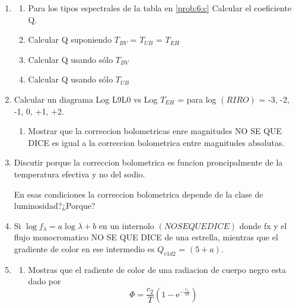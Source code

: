 \documentclass[10pt,spanish,a4paper,1p]{practice}
\begin{document}
\begin{enumerate}[wide, labelwidth=!, labelindent=0pt, label=\textbf{\textrm{\arabic*)}}, ref=\arabic*]
    \item\label{prob:8}\hfill
        \begin{enumerate}
            \item \label{prob:8:a} Para los tipos espectrales de la tabla en \ref{prob:6:c} Calcular el coeficiente Q.

            \item \label{prob:8:b} Calcular Q suponiendo $T_{BV}$ = $T_{UB}$ = $T_{EH}$

            \item \label{prob:8:c} Calcular Q usando sólo $T_{BV}$

            \item \label{prob:8:d} Calcular Q usando sólo $T_{UB}$
        \end{enumerate}

    \item\label{prob:9}Calcular un diagrama Log L9L0 vs Log $T_{EH}$ = para log $\left(RIRO\right)$ = -3, -2, -1, 0, +1, +2.

        \begin{enumerate}
            \item\label{prob:9:a} Mostrar que la correccion bolometricas enre magnitudes NO SE QUE DICE  es igual a la correccion bolometrica entre magnitudes absolutas.
       \end{enumerate}

    \item\label{prob:10} Discutir porque la correccion bolometrica es funcion proncipalmente de la temperatura efectiva y no del sodio.

        En esas condiciones la correccion bolometrica depende de la clase de luminosidad?¿Porque?

    \item\label{prob:11} Si $\log f_{\lambda} = a\log\lambda + b$ en un internolo $\left(NO SE QUE DICE\right)$ donde fx y el flujo monocromatico NO SE QUE DICE de una estrella, mientras que el gradiente de color en ese intermedio es $Q_{v1d2}$ = $\left(5+a\right)$.

    \item\label{prob:12}\hfill
        \begin{enumerate}
            \item\label{prob:12:a} Mostras que el radiente de color de una radiacion de cuerpo negro esta dado por
                $$
                    \Phi = \frac{c_2}{T}\left(1 - \mathrm{e}^{-\frac{c_2}{\lambda T}}\right)
                $$


\end{enumerate}
\end{enumerate}
\end{document}
